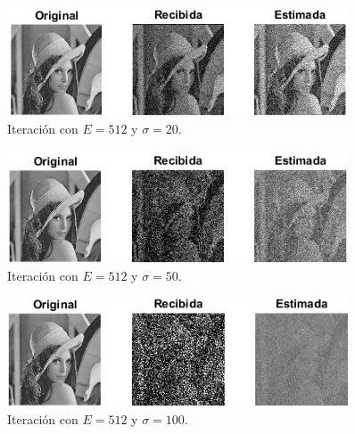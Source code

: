 \documentclass[a4paper]{article}
\begin{document}
\begin{itemize}
\begin{figure}[H]
	\end{figure}		
	\begin{figure}[H]
		\centering		
		\includegraphics[width=0.9\textwidth]{E512S20.png}
		\caption{Iteración con $ E = 512 $ y $ \sigma = 20 $.}
	\end{figure}		
	\begin{figure}[H]
		\centering	
		\includegraphics[width=0.9\textwidth]{E512S50.png}
		\caption{Iteración con $ E = 512 $ y $ \sigma = 50 $.}
	\end{figure}		
	\begin{figure}[H]
		\centering		
		\includegraphics[width=0.9\textwidth]{E512S100.png}
		\caption{Iteración con $ E = 512 $ y $ \sigma = 100 $.}
	\end{figure}
	

\end{itemize}
\end{document}
